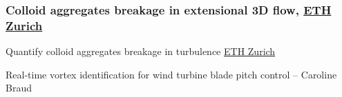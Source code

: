 \begin{frame}[label=app-24]
    \frametitle{Colloid aggregates breakage in extensional 3D flow, \href{https://www.dropbox.com/s/aufwfraotj5rll7/colloids1.mp4?raw=1}{ETH Zurich}}
\begin{center}
\end{center}    
\end{frame}
    
\begin{frame}[label=app-25]{Quantify colloid aggregates breakage in turbulence \href{https://www.dropbox.com/s/8cimpwfsukf11u2/colloids2.mp4?raw=1}{ETH Zurich}}
\begin{center}
\end{center}       
\end{frame}
    
    
\begin{frame}[label=app-26]{Real-time vortex identification for wind turbine blade pitch control -- Caroline Braud}
    \begin{multicols*}{2}
    \end{multicols*}
\end{frame}
    
